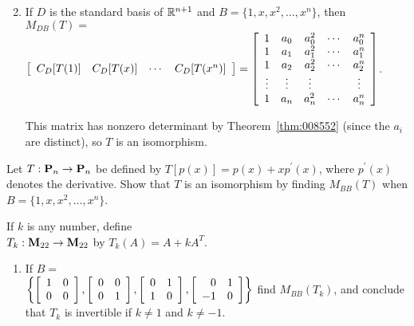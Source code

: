 \begin{multicols}{1}
\begin{ex}
\begin{enumerate}[label={\alph*.}]
\end{enumerate}
\begin{sol}
\begin{enumerate}[label={\alph*.}]
\setcounter{enumi}{1}
\item If $D$ is the standard basis of $\mathbb{R}^{n+1}$ and $B = \{1, x, x^{2}, \dots, x^{n}\}$, then $M_{DB}(T) = {}$ \\
$\left[ \begin{array}{cccc} C_D[T(1)] & C_D[T(x)] & \cdots & C_D[T(x^n)] \end{array} \right] =  \left[ \begin{array}{ccccc} 1 & a_0 & a_0^2 & \cdots & a_0^n \\ 1 & a_1 & a_1^2 & \cdots & a_1^n \\ 1 & a_2 & a_2^2 & \cdots & a_2^n \\ \vdots & \vdots & \vdots & & \vdots \\ 1 & a_n & a_n^2 & \cdots & a_n^n \\ \end{array} \right]$.

This matrix has nonzero determinant by Theorem~\ref{thm:008552} (since the $a_{i}$ are distinct), so $T$ is an isomorphism.
\end{enumerate}
\end{sol}
\end{ex}

\begin{ex}
Let $T : \textbf{P}_{n} \to \textbf{P}_{n}$ be defined by $T[p(x)] = p(x) + xp^\prime(x)$, where $p^\prime(x)$ denotes the derivative. Show that $T$ is an isomorphism by finding $M_{BB}(T)$ when $B = \{1, x, x^{2}, \dots, x^{n}\}$.
\end{ex}

\begin{ex}
If $k$ is any number, define \\$T_{k} : \textbf{M}_{22} \to \textbf{M}_{22}$ by $T_{k}(A) = A + kA^{T}$.

\begin{enumerate}[label={\alph*.}]
\item If $B = $ \\ \hspace*{-2em}$\left\{ \left[ \begin{array}{rr} 1 & 0 \\ 0 & 0 \end{array} \right], \left[ \begin{array}{rr} 0 & 0 \\ 0 & 1 \end{array} \right], \left[ \begin{array}{rr} 0 & 1 \\ 1 & 0 \end{array} \right], \left[ \begin{array}{rr} 0 & 1 \\ -1 & 0 \end{array} \right] \right\}$ find $M_{BB}(T_k)$, and conclude that $T_k$ is invertible if $k \neq 1$ and $k \neq -1$.


\end{enumerate}
\end{ex}
\end{multicols}
